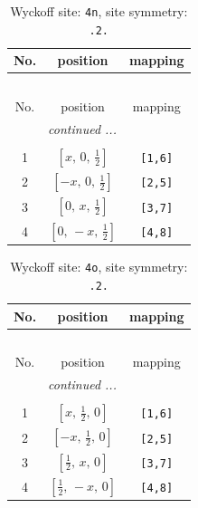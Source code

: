 \documentclass[fleqn,8pt]{jsarticle}
\begin{document}
\renewcommand{\arraystretch}{1.2}
\begin{longtable}{ccc}
\caption{Wyckoff site: {\tt 4n}, site symmetry: {\tt .2.}}
 \\
 \hline \hline
No. & position & mapping \\ \hline \endfirsthead

\multicolumn{2}{l}{\tablename\ \thetable{}} \\
 \hline \hline
No. & position & mapping \\ \hline \endhead

 \hline \hline
\multicolumn{2}{r}{\footnotesize\it continued ...} \\ \endfoot

 \hline \hline
\multicolumn{2}{r}{} \\ \endlastfoot

1 & $\left[ x,\, 0,\, \frac{1}{2} \right]$ & {\tt [1,6]} \\ \hline
2 & $\left[ - x,\, 0,\, \frac{1}{2} \right]$ & {\tt [2,5]} \\ \hline
3 & $\left[ 0,\, x,\, \frac{1}{2} \right]$ & {\tt [3,7]} \\ \hline
4 & $\left[ 0,\, - x,\, \frac{1}{2} \right]$ & {\tt [4,8]} \\
\end{longtable}
\renewcommand{\arraystretch}{1.2}
\begin{longtable}{ccc}
\caption{Wyckoff site: {\tt 4o}, site symmetry: {\tt .2.}}
 \\
 \hline \hline
No. & position & mapping \\ \hline \endfirsthead

\multicolumn{2}{l}{\tablename\ \thetable{}} \\
 \hline \hline
No. & position & mapping \\ \hline \endhead

 \hline \hline
\multicolumn{2}{r}{\footnotesize\it continued ...} \\ \endfoot

 \hline \hline
\multicolumn{2}{r}{} \\ \endlastfoot

1 & $\left[ x,\, \frac{1}{2},\, 0 \right]$ & {\tt [1,6]} \\ \hline
2 & $\left[ - x,\, \frac{1}{2},\, 0 \right]$ & {\tt [2,5]} \\ \hline
3 & $\left[ \frac{1}{2},\, x,\, 0 \right]$ & {\tt [3,7]} \\ \hline
4 & $\left[ \frac{1}{2},\, - x,\, 0 \right]$ & {\tt [4,8]} \\
\end{longtable}
\end{document}
